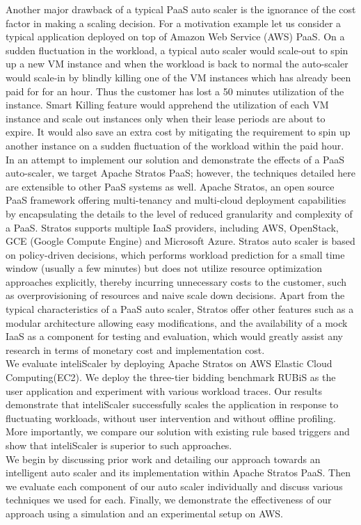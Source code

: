 Another major drawback of a typical PaaS auto scaler is the ignorance of the cost factor in making a scaling decision. For a motivation example let us consider a typical application deployed on top of Amazon Web Service (AWS) PaaS. On a sudden fluctuation in the workload, a typical auto scaler would scale-out to spin up a new VM instance and when the workload is back to normal the auto-scaler would scale-in by blindly killing one of the VM instances which has already been paid for for an hour. Thus the customer has lost a 50 minutes utilization of the instance. Smart Killing feature would apprehend the utilization of each VM instance and scale out instances only when their lease periods are about to expire. It would also save an extra cost by mitigating the requirement to spin up another instance on a sudden fluctuation of the workload within the paid hour.\\

In an attempt to implement our solution and demonstrate the effects of a PaaS auto-scaler, we target Apache Stratos PaaS; however, the techniques detailed here are extensible to other PaaS systems as well. Apache Stratos, an open source PaaS framework offering multi-tenancy and multi-cloud deployment capabilities by encapsulating the details to the level of reduced granularity and complexity of a PaaS. Stratos supports multiple IaaS providers, including AWS, OpenStack, GCE (Google Compute Engine) and Microsoft Azure\cite{website:stratos}. Stratos auto scaler is based on policy-driven  decisions, which performs workload prediction for a small time window (usually a few minutes) but does not utilize resource optimization approaches explicitly, thereby incurring unnecessary costs to the customer, such as overprovisioning of resources and naive scale down decisions. Apart from the typical characteristics of a PaaS auto scaler, Stratos offer other features such as a modular architecture allowing easy modifications, and the availability of a mock IaaS as a component for testing and evaluation, which would greatly assist any research in terms of monetary cost and implementation cost.\\

We evaluate inteliScaler by deploying  Apache Stratos on AWS Elastic Cloud Computing(EC2). We deploy the three-tier bidding benchmark RUBiS as the user application and experiment with various workload traces. Our results demonstrate that inteliScaler successfully scales the application in response to fluctuating workloads, without user intervention and without offline profiling. More importantly, we compare our solution with existing rule based triggers and show that inteliScaler is superior to such approaches.\\

We begin by discussing prior work and detailing our approach towards an intelligent auto scaler and its implementation within Apache Stratos PaaS. Then we evaluate each component of our auto scaler individually and discuss various techniques we used for each. Finally, we demonstrate the effectiveness of our approach using a simulation and an experimental setup on AWS. \\